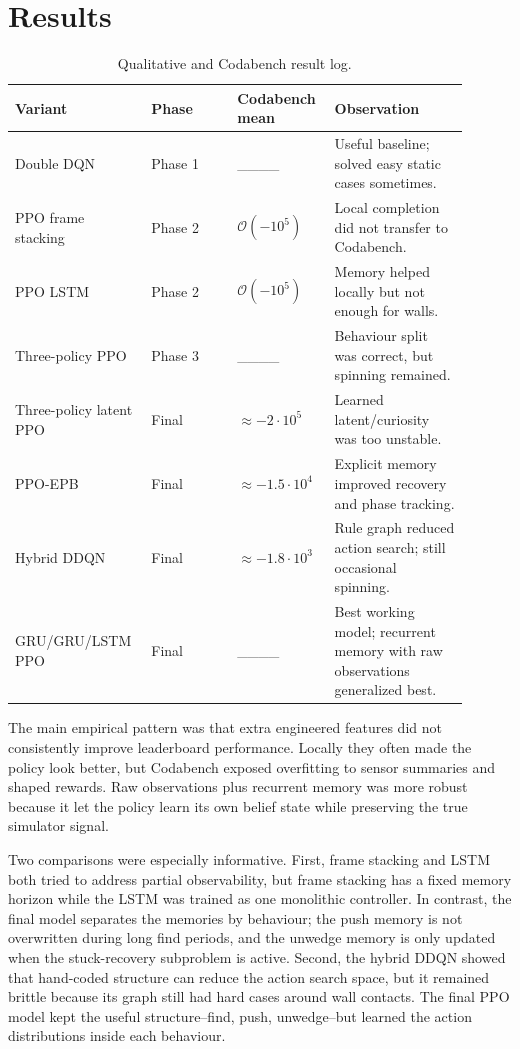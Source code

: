 \documentclass[11pt, oneside]{article}
\begin{document}
\section{Results}
\begin{table}[H]
\centering
\caption{Qualitative and Codabench result log.}
\begin{tabular}{p{0.24\linewidth}p{0.18\linewidth}p{0.20\linewidth}p{0.28\linewidth}}
\toprule
Variant & Phase & Codabench mean & Observation \\
\midrule
Double DQN & Phase 1 & \_\_\_\_ & Useful baseline; solved easy static cases sometimes. \\
PPO frame stacking & Phase 2 & $\mathcal{O}(-10^5)$ & Local completion did not transfer to Codabench. \\
PPO LSTM & Phase 2 & $\mathcal{O}(-10^5)$ & Memory helped locally but not enough for walls. \\
Three-policy PPO & Phase 3 & \_\_\_\_ & Behaviour split was correct, but spinning remained. \\
Three-policy latent PPO & Final & $\approx -2\cdot 10^5$ & Learned latent/curiosity was too unstable. \\
PPO-EPB & Final & $\approx -1.5\cdot 10^4$ & Explicit memory improved recovery and phase tracking. \\
Hybrid DDQN & Final & $\approx -1.8\cdot 10^3$ & Rule graph reduced action search; still occasional spinning. \\
GRU/GRU/LSTM PPO & Final & \_\_\_\_ & Best working model; recurrent memory with raw observations generalized best. \\
\bottomrule
\end{tabular}
\end{table}

The main empirical pattern was that extra engineered features did not consistently improve leaderboard performance. Locally they often made the policy look better, but Codabench exposed overfitting to sensor summaries and shaped rewards. Raw observations plus recurrent memory was more robust because it let the policy learn its own belief state while preserving the true simulator signal.

Two comparisons were especially informative. First, frame stacking and LSTM both tried to address partial observability, but frame stacking has a fixed memory horizon while the LSTM was trained as one monolithic controller. In contrast, the final model separates the memories by behaviour; the push memory is not overwritten during long find periods, and the unwedge memory is only updated when the stuck-recovery subproblem is active. Second, the hybrid DDQN showed that hand-coded structure can reduce the action search space, but it remained brittle because its graph still had hard cases around wall contacts. The final PPO model kept the useful structure--find, push, unwedge--but learned the action distributions inside each behaviour.
\end{document}
